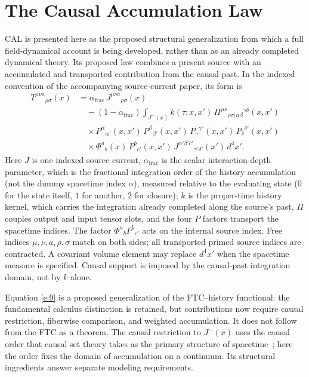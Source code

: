\documentclass[10pt]{article}
\newcommand{\afrac}{\alpha_{\mathrm{frac}}}
\begin{document}
\section{The Causal Accumulation Law}

CAL is presented here as the proposed structural generalization from which a full field-dynamical account is being developed, rather than as an already completed dynamical theory. Its proposed law combines a present source with an accumulated and transported contribution from the causal past. In the indexed convention of the accompanying source-current paper, its form is
\begin{equation}
\begin{split}
T^{\mu\nu a}{}_{\rho\sigma}(x)&=\afrac\,J^{\mu\nu a}{}_{\rho\sigma}(x)\\
&\quad-(1-\afrac)\int_{J^-(x)}k(\tau;x,x')\,\Pi^{\mu\nu}{}_{\rho\sigma|\alpha\beta}{}^{\gamma\delta}(x,x')\\
&\quad\times P^{\alpha}{}_{\alpha'}(x,x')\,P^{\beta}{}_{\beta'}(x,x')\,P_{\gamma}{}^{\gamma'}(x,x')\,P_{\delta}{}^{\delta'}(x,x')\\
&\quad\times\Phi^{a}{}_{b}(x)\,P^{b}{}_{c'}(x,x')\,J^{\alpha'\beta'c'}{}_{\gamma'\delta'}(x')\,d^4x'.
\end{split}\label{e:9}
\end{equation}
Here $J$ is one indexed source current, $\afrac$ is the scalar interaction-depth parameter, which is the fractional integration order of the history accumulation (not the dummy spacetime index $\alpha$), measured relative to the evaluating state ($0$ for the state itself, $1$ for another, $2$ for closure); $k$ is the proper-time history kernel, which carries the integration already completed along the source's past, $\Pi$ couples output and input tensor slots, and the four $P$ factors transport the spacetime indices. The factor $\Phi^a{}_bP^b{}_{c'}$ acts on the internal source index. Free indices $\mu,\nu,a,\rho,\sigma$ match on both sides; all transported primed source indices are contracted. A covariant volume element may replace $d^4x'$ when the spacetime measure is specified. Causal support is imposed by the causal-past integration domain, not by $k$ alone.

Equation \eqref{e:9} is a proposed generalization of the FTC--history functional: the fundamental calculus distinction is retained, but contributions now require causal restriction, fiberwise comparison, and weighted accumulation. It does not follow from the FTC as a theorem. The causal restriction to $J^-(x)$ uses the causal order that causal set theory takes as the primary structure of spacetime~\cite{bombelli}; here the order fixes the domain of accumulation on a continuum. Its structural ingredients answer separate modeling requirements.
\end{document}
